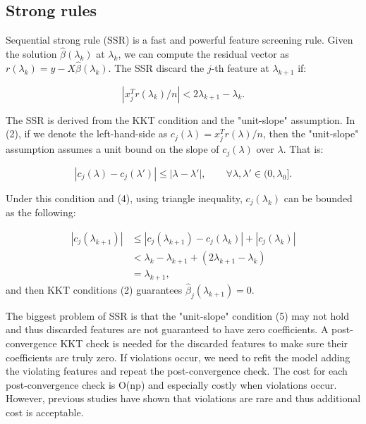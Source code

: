 \documentclass{article}
\begin{document}
\subsection{Strong rules}

Sequential strong rule (SSR) \cite{tibshirani2011regression} is a fast and powerful feature screening rule. Given the solution $\hat{\beta}(\lambda_k)$ at $\lambda_k$, we can compute the residual vector as $r(\lambda_k)=y-X\hat{\beta}(\lambda_k)$. The SSR discard the $j$-th feature at $\lambda_{k+1}$ if:

\begin{equation}
    |x_j^Tr(\lambda_k)/n|<2\lambda_{k+1}-\lambda_k.
\end{equation}

The SSR is derived from the KKT condition and the "unit-slope" assumption. In (2), if we denote the left-hand-side as $c_j(\lambda)=x_j^Tr(\lambda)/n$, then the "unit-slope" assumption assumes a unit bound on the slope of $c_j(\lambda)$ over $\lambda$. That is:

\begin{equation}
    |c_j(\lambda)-c_j(\lambda')|\leq |\lambda-\lambda'|,\qquad \forall \lambda,\lambda'\in(0,\lambda_0].
\end{equation}

Under this condition and (4), using triangle inequality, $c_j(\lambda_k)$ can be bounded as the following:

\begin{equation}
    \begin{split}
        |c_j(\lambda_{k+1})| &\leq |c_j(\lambda_{k+1})-c_j(\lambda_k)| + |c_j(\lambda_k)|\\
    &< \lambda_k - \lambda_{k+1} + (2\lambda_{k+1}-\lambda_k)\\
    &=\lambda_{k+1},
    \end{split}
\end{equation}
and then KKT conditions (2) guarantees $\hat{\beta}_j(\lambda_{k+1})=0$.

The biggest problem of SSR is that the "unit-slope" condition (5) may not hold and thus discarded features are not guaranteed to have zero coefficients. A post-convergence KKT check is needed for the discarded features to make sure their coefficients are truly zero. If violations occur, we need to refit the model adding the violating features and repeat the post-convergence check. The cost for each post-convergence check is O(np) and especially costly when violations occur. However, previous studies have shown that violations are rare and thus additional cost is acceptable.
\end{document}
